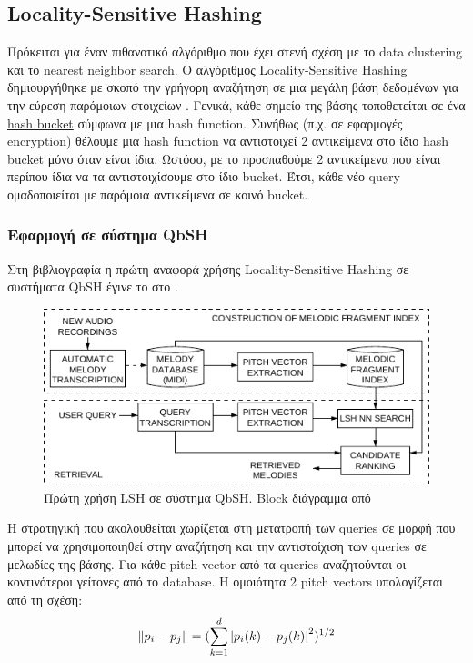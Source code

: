 \newcommand*{\ls}{Locality-Sensitive}%
\newcommand*{\lsh}{Locality-Sensitive Hashing}%
\subsection{\lsh{}}\label{sub:lsh}
Πρόκειται για έναν πιθανοτικό αλγόριθμο που έχει στενή σχέση με το data clustering και το nearest neighbor search.
O αλγόριθμος \lsh{} δημιουργήθηκε με σκοπό την γρήγορη αναζήτηση σε μια μεγάλη βάση δεδομένων για την εύρεση παρόμοιων στοιχείων \cite{slaney2008locality}.
Γενικά, κάθε σημείο της βάσης τοποθετείται σε ένα \href{https://en.wikipedia.org/wiki/Hash_table}{hash bucket} σύμφωνα με μια hash function.
Συνήθως (π.χ. σε εφαρμογές encryption) θέλουμε μια hash function να αντιστοιχεί 2 αντικείμενα στο ίδιο hash bucket μόνο όταν είναι ίδια.
Ωστόσο, με το  προσπαθούμε 2 αντικείμενα που είναι περίπου ίδια να τα αντιστοιχίσουμε στο ίδιο bucket.
Έτσι, κάθε νέο query ομαδοποιείται με παρόμοια αντικείμενα σε κοινό bucket.

\subsubsection{Εφαρμογή σε σύστημα QbSH}
Στη βιβλιογραφία η πρώτη αναφορά χρήσης \lsh{} σε συστήματα QbSH έγινε το \citeyear{ryynanen2008query} στο \cite{ryynanen2008query}.

\begin{figure}
        \centering
        \vspace{-20pt}\includegraphics[width=\linewidth]{ryynanen2008query}
        \vspace{-20pt}\caption{Πρώτη χρήση LSH σε σύστημα QbSH. Block διάγραμμα από \protect\cite{ryynanen2008query}}
        \label{fig:ryynanen2008query}
\end{figure}

Η στρατηγική που ακολουθείται χωρίζεται στη
μετατροπή των queries σε μορφή που μπορεί να χρησιμοποιηθεί στην αναζήτηση και
την αντιστοίχιση των queries σε μελωδίες της βάσης.
Για κάθε pitch vector από τα queries αναζητούνται οι κοντινότεροι γείτονες από το database.
Η ομοιότητα 2 pitch vectors υπολογίζεται από τη σχέση:
\begin{equation*}
\left\lVert p_i - p_j\right\rVert = (\sum\limits_{k=1}^{d}\left\lvert p_i(k) - p_j(k)\right\rvert^2)^{1/2}
\end{equation*}

